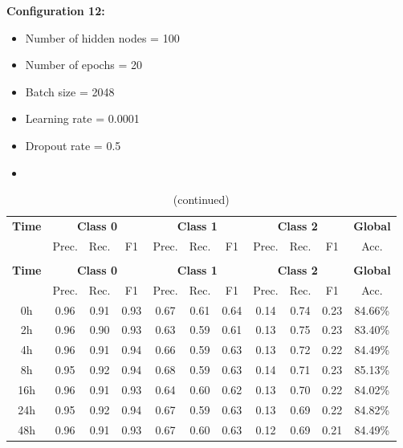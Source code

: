 \documentclass[12pt,oneside]{book} %
\begin{document}
\noindent \textbf{Configuration 12:}
\begin{multicols}{2}
    \begin{itemize}
        \item Number of hidden nodes = 100
        \item Number of epochs = 20
        \item Batch size = 2048
    \end{itemize}
    \begin{itemize}
         \item Learning rate = 0.0001
         \item Dropout rate  = 0.5
         \item[\hspace{0pt}]
    \end{itemize}
\end{multicols}

\setlength\LTleft{1cm}
\begin{longtable}{ c ccc ccc ccc c}
\caption{Performance metrics of the LNN model for configuration 12} \\
\toprule
\textbf{Time} & \multicolumn{3}{c}{\textbf{Class 0}} & \multicolumn{3}{c}{\textbf{Class 1}} & \multicolumn{3}{c}{\textbf{Class 2}} & \textbf{Global} \\
               & Prec. & Rec. & F1  & Prec. & Rec. & F1   & Prec. & Rec. & F1  & Acc. \\
\midrule
\endfirsthead

\caption[]{(continued)} \\
\toprule
\textbf{Time} & \multicolumn{3}{c}{\textbf{Class 0}} & \multicolumn{3}{c}{\textbf{Class 1}} & \multicolumn{3}{c}{\textbf{Class 2}} & \textbf{Global} \\
               & Prec. & Rec. & F1  & Prec. & Rec. & F1   & Prec. & Rec. & F1  & Acc. \\
\midrule
\endhead

\bottomrule
\endfoot

\bottomrule
\endlastfoot

0h   & 0.96  & 0.91 & 0.93 & 0.67  & 0.61 & 0.64  & 0.14  & 0.74 & 0.23 & 84.66\% \\
2h   & 0.96  & 0.90 & 0.93 & 0.63  & 0.59 & 0.61  & 0.13  & 0.75 & 0.23 & 83.40\% \\
4h   & 0.96  & 0.91 & 0.94 & 0.66  & 0.59 & 0.63  & 0.13  & 0.72 & 0.22 & 84.49\% \\
8h   & 0.95  & 0.92 & 0.94 & 0.68  & 0.59 & 0.63  & 0.14  & 0.71 & 0.23 & 85.13\% \\
16h  & 0.96  & 0.91 & 0.93 & 0.64  & 0.60 & 0.62  & 0.13  & 0.70 & 0.22 & 84.02\% \\
24h  & 0.95  & 0.92 & 0.94 & 0.67  & 0.59 & 0.63  & 0.13  & 0.69 & 0.22 & 84.82\% \\
48h  & 0.96  & 0.91 & 0.93 & 0.67  & 0.60 & 0.63  & 0.12  & 0.69 & 0.21 & 84.49\% \\
\end{longtable}
\end{document}
